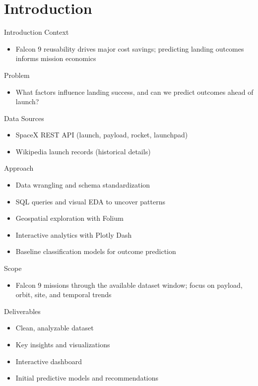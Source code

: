 \section{Introduction}

\begin{frame}[allowframebreaks]{Introduction}
    \large Context
    \begin{itemize}
        \item Falcon 9 reusability drives major cost savings; predicting landing outcomes informs mission economics
    \end{itemize}
    \large Problem
    \begin{itemize}
        \item What factors influence landing success, and can we predict outcomes ahead of launch?
    \end{itemize}
    \large Data Sources
    \begin{itemize}
        \item SpaceX REST API (launch, payload, rocket, launchpad)
        \item Wikipedia launch records (historical details)
    \end{itemize}
    \large Approach
    \begin{itemize}
        \item Data wrangling and schema standardization
        \item SQL queries and visual EDA to uncover patterns
        \item Geospatial exploration with Folium
        \item Interactive analytics with Plotly Dash
        \item Baseline classification models for outcome prediction
    \end{itemize}
    \large Scope
    \begin{itemize}
        \item Falcon 9 missions through the available dataset window; focus on payload, orbit, site, and temporal trends
    \end{itemize}
    \large Deliverables
    \begin{itemize}
        \item Clean, analyzable dataset
        \item Key insights and visualizations
        \item Interactive dashboard
        \item Initial predictive models and recommendations
    \end{itemize}
\end{frame}

